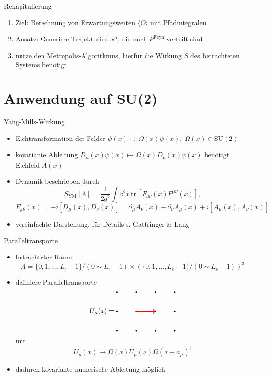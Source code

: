 \documentclass[ngerman]{beamer}
\begin{document}
\begin{frame}{Rekapitulierung}
\begin{enumerate}
	\item Ziel: Berechnung von Erwartungswerten $\langle O \rangle$ mit Pfadintegralen
	\item Ansatz: Generiere Trajektorien $x^\alpha$, die nach $P^\text{Feyn}$ verteilt sind
	\item nutze den Metropolis-Algorithmus, hierfür die Wirkung $S$ des betrachteten Systems benötigt
\end{enumerate}
\end{frame}

\section{Anwendung auf SU(2)}

\begin{frame}{Yang-Mills-Wirkung}
\begin{itemize}
	\item Eichtransformation der Felder $\psi(x) \mapsto \Omega(x) \psi(x), \; \Omega(x) \in \mathrm{SU}(2)$
	\item kovariante Ableitung $D_\mu(x) \psi(x) \mapsto \Omega(x) D_\mu(x) \psi(x)$ benötigt Eichfeld $A(x)$
	\item Dynamik beschrieben durch
	\[
	S_\text{YM}[A] = \frac{1}{2 g^2} \int \dd^4{x} \, \mathrm{tr}\,
	\left[ F_{\mu \nu}(x) F^{\mu \nu}(x) \right],
	\]	
	\[
	F_{\mu \nu}(x) = -i [D_\mu(x), D_\nu(x)]
	= \partial_\mu A_\nu(x) - \partial_\nu A_\mu(x) + i [A_\mu(x), A_\nu(x)]
	\]
	\item vereinfachte Darstellung, für Details s. Gattringer \& Lang~\cite{gattringerLang}
\end{itemize}
\end{frame}

\begin{frame}{Paralleltransporte}
\begin{itemize}
	\item betrachteter Raum:
	\[
	\Lambda = \{0, 1, \dots, L_\mathrm{t}-1\}/(0 \sim L_\mathrm{t}-1)
	\times \left( \{0, 1, \dots, L_\mathrm{s}-1 \} / (0 \sim L_\mathrm{s}-1) \right)^3
	\]
	\item definiere Paralleltransporte
	\[
	U_\mu(x) = 
	\begin{tikzpicture}[baseline=-0.5ex]
	\foreach \x in {0,...,3}
	{
		\foreach \y in {-1,...,1}
		{
			\fill[color=black] (\x,\y) circle (.04);
		}
	}
	\draw[->, red, very thick] (1,0) -> (2,0);
	\end{tikzpicture}
	\]
	mit
	\[
	U_\mu(x) \mapsto \Omega(x) U_\mu(x) \Omega(x + a_\mu)^\dag
	\]
	\item dadurch kovariante numerische Ableitung möglich%

\end{itemize}
\end{frame}
\end{document}
